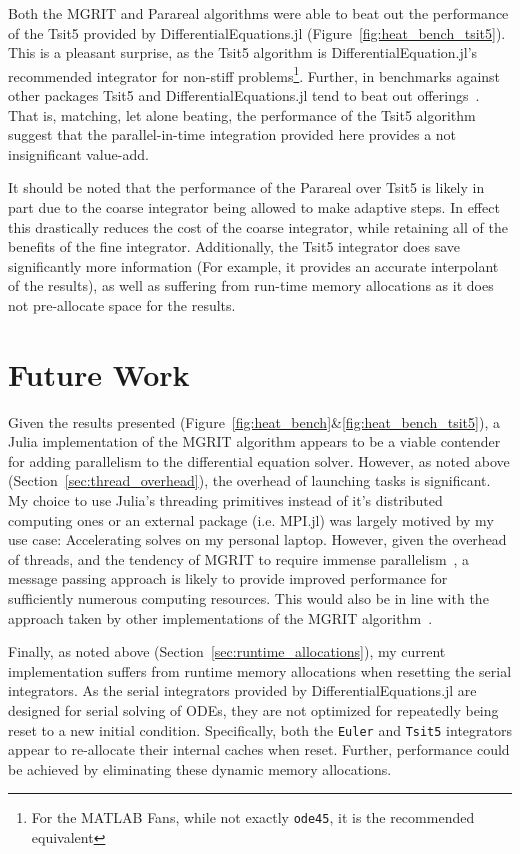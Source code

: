\documentclass{article}
\begin{document}
Both the MGRIT and Parareal algorithms were able to beat out the performance of the Tsit5 provided by DifferentialEquations.jl (Figure~\ref{fig:heat_bench_tsit5}).
This is a pleasant surprise, as the Tsit5 algorithm is DifferentialEquation.jl's recommended integrator for non-stiff problems\footnote{For the MATLAB Fans, while not exactly \verb!ode45!, it is the recommended equivalent\cite{ODESolversDifferentialEquations}}.
Further, in benchmarks against other packages Tsit5 and DifferentialEquations.jl tend to beat out offerings~\cite{ODESolverMultiLanguage}.
That is, matching, let alone beating, the performance of the Tsit5 algorithm suggest that the parallel-in-time integration provided here provides a not insignificant value-add.

It should be noted that the performance of the Parareal over Tsit5 is likely in part due to the coarse integrator being allowed to make adaptive steps.
In effect this drastically reduces the cost of the coarse integrator, while retaining all of the benefits of the fine integrator.
Additionally, the Tsit5 integrator does save significantly more information (For example, it provides an accurate interpolant of the results), as well as suffering from run-time memory allocations as it does not pre-allocate space for the results.


\section{Future Work}

Given the results presented (Figure~\ref{fig:heat_bench}&\ref{fig:heat_bench_tsit5}), a Julia implementation of the MGRIT algorithm appears to be a viable contender for adding parallelism to the differential equation solver.
However, as noted above (Section~\ref{sec:thread_overhead}), the overhead of launching tasks is significant.
My choice to use Julia's threading primitives instead of it's distributed computing ones or an external package (i.e. MPI.jl) was largely motived by my use case: Accelerating solves on my personal laptop.
However, given the overhead of threads, and the tendency of MGRIT to require immense parallelism~\cite{friedhoffMULTIGRIDINTIMEALGORITHMSOLVING}, a message passing approach is likely to provide improved performance for sufficiently numerous computing resources.
This would also be in line with the approach taken by other implementations of the MGRIT algorithm~\cite{xbraid-package, hahnePyMGRITPythonPackage2020}.

Finally, as noted above (Section~\ref{sec:runtime_allocations}), my current implementation suffers from runtime memory allocations when resetting the serial integrators.
As the serial integrators provided by DifferentialEquations.jl are designed for serial solving of ODEs, they are not optimized for repeatedly being reset to a new initial condition.
Specifically, both the \verb!Euler! and \verb!Tsit5! integrators appear to re-allocate their internal caches when reset.
Further, performance could be achieved by eliminating these dynamic memory allocations.
\end{document}
